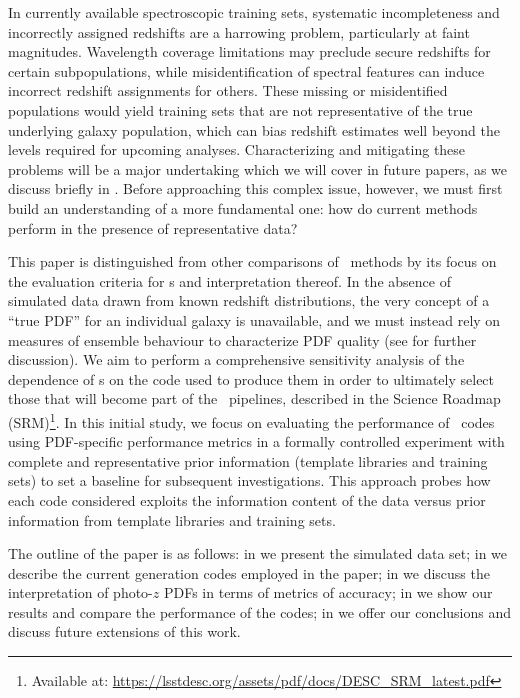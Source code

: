 In currently available spectroscopic training sets, systematic incompleteness and incorrectly assigned redshifts are a harrowing problem, particularly at faint magnitudes.  
Wavelength coverage limitations may preclude secure redshifts for certain subpopulations, while misidentification of spectral features can induce incorrect redshift assignments for others.  
These missing or misidentified populations would yield training sets that are not representative of the true underlying galaxy population, which can bias redshift estimates well beyond the levels required for upcoming analyses.  
Characterizing and mitigating these problems will be a major undertaking which we will cover in future papers, as we discuss briefly in .  
Before approaching this complex issue, however, we must first build an understanding of a more fundamental one: 
how do current methods perform in the presence of representative data?

This paper is distinguished from other comparisons of \pz\ methods by its focus on the evaluation criteria for \pzpdf s and interpretation thereof.
In the absence of simulated data drawn from known redshift distributions, the very concept of a ``true PDF'' for an individual galaxy is unavailable, and we must instead rely on measures of ensemble behaviour to characterize PDF quality (see  for further discussion).
We aim to perform a comprehensive sensitivity analysis of the dependence of \pzpdf s on the code used to produce them in order to ultimately select those that will become part of the \lsst\ pipelines, described in the Science Roadmap (SRM)\footnote{Available at: \url{https://lsstdesc.org/assets/pdf/docs/DESC_SRM_latest.pdf}}.
In this initial study, we focus on evaluating the performance of \pzpdf\ codes using PDF-specific performance metrics in a formally controlled experiment with complete and representative prior information (template libraries and training sets) to set a baseline for subsequent investigations.
This approach probes how each code considered exploits the information content of the data versus prior information from template libraries and training sets.

The outline of the paper is as follows: in  we present the simulated data set; in  we describe the current generation codes employed in the paper; in  we discuss the interpretation of photo-$z$ PDFs in terms of metrics of accuracy; in  we show our results and compare the performance of the codes; in  we offer our conclusions and discuss future extensions of this work.

